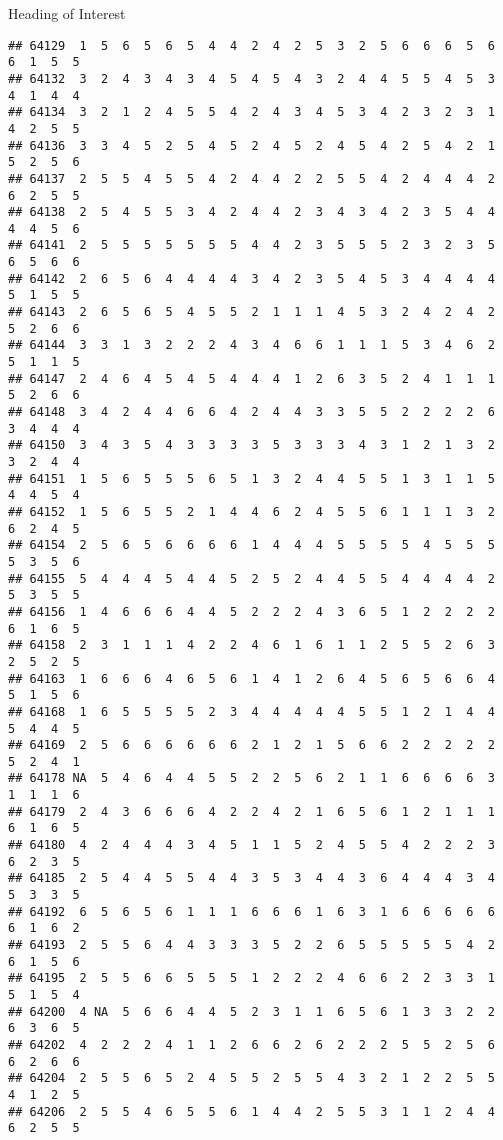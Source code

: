 \documentclass[
  ignorenonframetext,
]{beamer}
\begin{document}
\begin{frame}[fragile]{Heading of Interest}
\begin{verbatim}
## 64129  1  5  6  5  6  5  4  4  2  4  2  5  3  2  5  6  6  6  5  6  6  1  5  5
## 64132  3  2  4  3  4  3  4  5  4  5  4  3  2  4  4  5  5  4  5  3  4  1  4  4
## 64134  3  2  1  2  4  5  5  4  2  4  3  4  5  3  4  2  3  2  3  1  4  2  5  5
## 64136  3  3  4  5  2  5  4  5  2  4  5  2  4  5  4  2  5  4  2  1  5  2  5  6
## 64137  2  5  5  4  5  5  4  2  4  4  2  2  5  5  4  2  4  4  4  2  6  2  5  5
## 64138  2  5  4  5  5  3  4  2  4  4  2  3  4  3  4  2  3  5  4  4  4  4  5  6
## 64141  2  5  5  5  5  5  5  5  4  4  2  3  5  5  5  2  3  2  3  5  6  5  6  6
## 64142  2  6  5  6  4  4  4  4  3  4  2  3  5  4  5  3  4  4  4  4  5  1  5  5
## 64143  2  6  5  6  5  4  5  5  2  1  1  1  4  5  3  2  4  2  4  2  5  2  6  6
## 64144  3  3  1  3  2  2  2  4  3  4  6  6  1  1  1  5  3  4  6  2  5  1  1  5
## 64147  2  4  6  4  5  4  5  4  4  4  1  2  6  3  5  2  4  1  1  1  5  2  6  6
## 64148  3  4  2  4  4  6  6  4  2  4  4  3  3  5  5  2  2  2  2  6  3  4  4  4
## 64150  3  4  3  5  4  3  3  3  3  5  3  3  3  4  3  1  2  1  3  2  3  2  4  4
## 64151  1  5  6  5  5  5  6  5  1  3  2  4  4  5  5  1  3  1  1  5  4  4  5  4
## 64152  1  5  6  5  5  2  1  4  4  6  2  4  5  5  6  1  1  1  3  2  6  2  4  5
## 64154  2  5  6  5  6  6  6  6  1  4  4  4  5  5  5  5  4  5  5  5  5  3  5  6
## 64155  5  4  4  4  5  4  4  5  2  5  2  4  4  5  5  4  4  4  4  2  5  3  5  5
## 64156  1  4  6  6  6  4  4  5  2  2  2  4  3  6  5  1  2  2  2  2  6  1  6  5
## 64158  2  3  1  1  1  4  2  2  4  6  1  6  1  1  2  5  5  2  6  3  2  5  2  5
## 64163  1  6  6  6  4  6  5  6  1  4  1  2  6  4  5  6  5  6  6  4  5  1  5  6
## 64168  1  6  5  5  5  5  2  3  4  4  4  4  4  5  5  1  2  1  4  4  5  4  4  5
## 64169  2  5  6  6  6  6  6  6  2  1  2  1  5  6  6  2  2  2  2  2  5  2  4  1
## 64178 NA  5  4  6  4  4  5  5  2  2  5  6  2  1  1  6  6  6  6  3  1  1  1  6
## 64179  2  4  3  6  6  6  4  2  2  4  2  1  6  5  6  1  2  1  1  1  6  1  6  5
## 64180  4  2  4  4  4  3  4  5  1  1  5  2  4  5  5  4  2  2  2  3  6  2  3  5
## 64185  2  5  4  4  5  5  4  4  3  5  3  4  4  3  6  4  4  4  3  4  5  3  3  5
## 64192  6  5  6  5  6  1  1  1  6  6  6  1  6  3  1  6  6  6  6  6  6  1  6  2
## 64193  2  5  5  6  4  4  3  3  3  5  2  2  6  5  5  5  5  5  4  2  6  1  5  6
## 64195  2  5  5  6  6  5  5  5  1  2  2  2  4  6  6  2  2  3  3  1  5  1  5  4
## 64200  4 NA  5  6  6  4  4  5  2  3  1  1  6  5  6  1  3  3  2  2  6  3  6  5
## 64202  4  2  2  2  4  1  1  2  6  6  2  6  2  2  2  5  5  2  5  6  6  2  6  6
## 64204  2  5  5  6  5  2  4  5  5  2  5  5  4  3  2  1  2  2  5  5  4  1  2  5
## 64206  2  5  5  4  6  5  5  6  1  4  4  2  5  5  3  1  1  2  4  4  6  2  5  5

\end{verbatim}
\end{frame}
\end{document}
